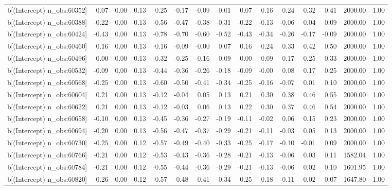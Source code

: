 \begin{table}[ht]
\begin{tabular}{rrrrrrrrrrrrrrr}
  b[(Intercept) n\_obs:60352] & 0.07 & 0.00 & 0.13 & -0.25 & -0.17 & -0.09 & -0.01 & 0.07 & 0.16 & 0.24 & 0.32 & 0.41 & 2000.00 & 1.00 \\ 
  b[(Intercept) n\_obs:60388] & -0.22 & 0.00 & 0.13 & -0.56 & -0.47 & -0.38 & -0.31 & -0.22 & -0.13 & -0.06 & 0.04 & 0.09 & 2000.00 & 1.00 \\ 
  b[(Intercept) n\_obs:60424] & -0.43 & 0.00 & 0.13 & -0.78 & -0.70 & -0.60 & -0.52 & -0.43 & -0.34 & -0.26 & -0.17 & -0.09 & 2000.00 & 1.00 \\ 
  b[(Intercept) n\_obs:60460] & 0.16 & 0.00 & 0.13 & -0.16 & -0.09 & -0.00 & 0.07 & 0.16 & 0.24 & 0.33 & 0.42 & 0.50 & 2000.00 & 1.00 \\ 
  b[(Intercept) n\_obs:60496] & 0.00 & 0.00 & 0.13 & -0.32 & -0.25 & -0.16 & -0.09 & -0.00 & 0.09 & 0.17 & 0.25 & 0.33 & 2000.00 & 1.00 \\ 
  b[(Intercept) n\_obs:60532] & -0.09 & 0.00 & 0.13 & -0.44 & -0.36 & -0.26 & -0.18 & -0.09 & -0.00 & 0.08 & 0.17 & 0.25 & 2000.00 & 1.00 \\ 
  b[(Intercept) n\_obs:60568] & -0.25 & 0.00 & 0.13 & -0.60 & -0.50 & -0.41 & -0.34 & -0.25 & -0.16 & -0.07 & 0.01 & 0.10 & 2000.00 & 1.00 \\ 
  b[(Intercept) n\_obs:60604] & 0.21 & 0.00 & 0.13 & -0.12 & -0.04 & 0.05 & 0.13 & 0.21 & 0.30 & 0.38 & 0.46 & 0.55 & 2000.00 & 1.00 \\ 
  b[(Intercept) n\_obs:60622] & 0.21 & 0.00 & 0.13 & -0.12 & -0.03 & 0.06 & 0.13 & 0.22 & 0.30 & 0.37 & 0.46 & 0.54 & 2000.00 & 1.00 \\ 
  b[(Intercept) n\_obs:60658] & -0.10 & 0.00 & 0.13 & -0.45 & -0.36 & -0.27 & -0.19 & -0.11 & -0.02 & 0.06 & 0.15 & 0.23 & 2000.00 & 1.00 \\ 
  b[(Intercept) n\_obs:60694] & -0.20 & 0.00 & 0.13 & -0.56 & -0.47 & -0.37 & -0.29 & -0.21 & -0.11 & -0.03 & 0.05 & 0.13 & 2000.00 & 1.00 \\ 
  b[(Intercept) n\_obs:60730] & -0.25 & 0.00 & 0.12 & -0.57 & -0.49 & -0.40 & -0.33 & -0.25 & -0.17 & -0.10 & -0.01 & 0.09 & 2000.00 & 1.00 \\ 
  b[(Intercept) n\_obs:60766] & -0.21 & 0.00 & 0.12 & -0.53 & -0.43 & -0.36 & -0.28 & -0.21 & -0.13 & -0.06 & 0.03 & 0.11 & 1582.04 & 1.00 \\ 
  b[(Intercept) n\_obs:60784] & -0.21 & 0.00 & 0.12 & -0.55 & -0.44 & -0.36 & -0.29 & -0.21 & -0.13 & -0.06 & 0.02 & 0.10 & 1601.95 & 1.00 \\ 
  b[(Intercept) n\_obs:60820] & -0.26 & 0.00 & 0.12 & -0.57 & -0.48 & -0.41 & -0.34 & -0.25 & -0.18 & -0.11 & -0.02 & 0.07 & 1647.80 & 1.00 \\ 

\end{tabular}
\end{table}
